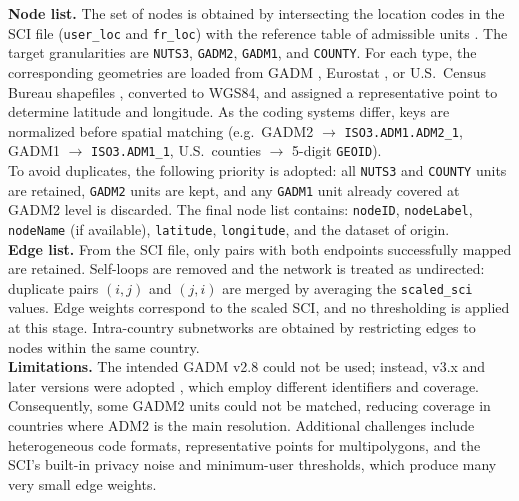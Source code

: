 \textbf{Node list.}  
The set of nodes is obtained by intersecting the location codes in the SCI file (\texttt{user\_loc} and \texttt{fr\_loc}) with the reference table of admissible units \cite{gadm1nuts2csv}. The target granularities are \texttt{NUTS3}, \texttt{GADM2}, \texttt{GADM1}, and \texttt{COUNTY}. For each type, the corresponding geometries are loaded from GADM \cite{gadm}, Eurostat \cite{eurostatNUTS}, or U.S.\ Census Bureau shapefiles \cite{uscensusCounties}, converted to WGS84, and assigned a representative point to determine latitude and longitude.  
As the coding systems differ, keys are normalized before spatial matching (e.g.\ GADM2 $\rightarrow$ \texttt{ISO3.ADM1.ADM2\_1}, GADM1 $\rightarrow$ \texttt{ISO3.ADM1\_1}, U.S.\ counties $\rightarrow$ 5-digit \texttt{GEOID}). \\
To avoid duplicates, the following priority is adopted: all \texttt{NUTS3} and \texttt{COUNTY} units are retained, \texttt{GADM2} units are kept, and any \texttt{GADM1} unit already covered at GADM2 level is discarded.  
The final node list contains: \texttt{nodeID}, \texttt{nodeLabel}, \texttt{nodeName} (if available), \texttt{latitude}, \texttt{longitude}, and the dataset of origin.  \\
\textbf{Edge list.}  
From the SCI file, only pairs with both endpoints successfully mapped are retained. Self-loops are removed and the network is treated as undirected: duplicate pairs $(i,j)$ and $(j,i)$ are merged by averaging the \texttt{scaled\_sci} values. Edge weights correspond to the scaled SCI, and no thresholding is applied at this stage. Intra-country subnetworks are obtained by restricting edges to nodes within the same country.\\  
\textbf{Limitations.}  
The intended GADM v2.8 could not be used; instead, v3.x and later versions were adopted \cite{gadm}, which employ different identifiers and coverage. Consequently, some GADM2 units could not be matched, reducing coverage in countries where ADM2 is the main resolution. Additional challenges include heterogeneous code formats, representative points for multipolygons, and the SCI’s built-in privacy noise and minimum-user thresholds, which produce many very small edge weights.

